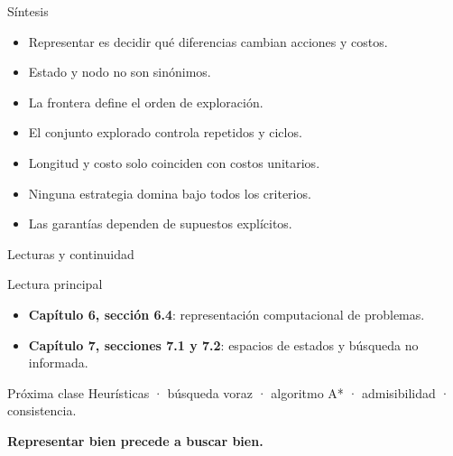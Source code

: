\documentclass[aspectratio=169,11pt]{beamer}
\newcommand{\concepto}[1]{\textcolor{UAPTeal}{\textbf{#1}}}
\begin{document}
\begin{frame}{Síntesis}
  \begin{itemize}
    \item Representar es decidir qué diferencias cambian acciones y costos.
    \item Estado y nodo no son sinónimos.
    \item La frontera define el orden de exploración.
    \item El conjunto explorado controla repetidos y ciclos.
    \item Longitud y costo solo coinciden con costos unitarios.
    \item Ninguna estrategia domina bajo todos los criterios.
    \item Las garantías dependen de supuestos explícitos.
  \end{itemize}
\end{frame}

\begin{frame}{Lecturas y continuidad}
  \begin{block}{Lectura principal}
    \begin{itemize}
      \item \textbf{Capítulo 6, sección 6.4}: representación computacional de problemas.
      \item \textbf{Capítulo 7, secciones 7.1 y 7.2}: espacios de estados y búsqueda no informada.
    \end{itemize}
  \end{block}
  \begin{block}{Próxima clase}
    Heurísticas · búsqueda voraz · algoritmo A* · admisibilidad · consistencia.
  \end{block}
  \vfill
  \centering\Large\concepto{Representar bien precede a buscar bien.}
\end{frame}
\end{document}
